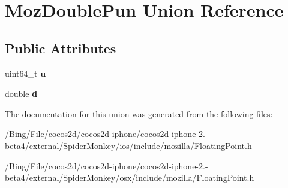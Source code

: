 \hypertarget{union_moz_double_pun}{\section{Moz\-Double\-Pun Union Reference}
\label{union_moz_double_pun}
}
\subsection*{Public Attributes}
\begin{DoxyCompactItemize}
\item 
\hypertarget{union_moz_double_pun_a5db6c525b97aa6727455238726623151}{uint64\-\_\-t {\bfseries u}}\label{union_moz_double_pun_a5db6c525b97aa6727455238726623151}

\item 
\hypertarget{union_moz_double_pun_a7bfe6e67911115d67e5cf9181ef66c00}{double {\bfseries d}}\label{union_moz_double_pun_a7bfe6e67911115d67e5cf9181ef66c00}

\end{DoxyCompactItemize}


The documentation for this union was generated from the following files\-:\begin{DoxyCompactItemize}
\item 
/\-Bing/\-File/cocos2d/cocos2d-\/iphone/cocos2d-\/iphone-\/2.-\/beta4/external/\-Spider\-Monkey/ios/include/mozilla/Floating\-Point.\-h\item 
/\-Bing/\-File/cocos2d/cocos2d-\/iphone/cocos2d-\/iphone-\/2.-\/beta4/external/\-Spider\-Monkey/osx/include/mozilla/Floating\-Point.\-h\end{DoxyCompactItemize}

